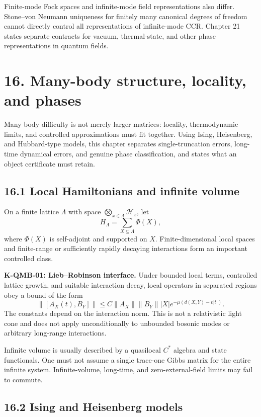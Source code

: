 \documentclass[
  11pt,
  oneside]{book}
\begin{document}
Finite-mode Fock spaces and infinite-mode field representations also
differ. Stone--von Neumann uniqueness for finitely many canonical
degrees of freedom cannot directly control all representations of
infinite-mode CCR. Chapter 21 states separate contracts for vacuum,
thermal-state, and other phase representations in quantum fields.

\chapter{16. Many-body structure, locality, and phases}\label{ch-16}

Many-body difficulty is not merely larger matrices: locality,
thermodynamic limits, and controlled approximations must fit together.
Using Ising, Heisenberg, and Hubbard-type models, this chapter separates
single-truncation errors, long-time dynamical errors, and genuine phase
classification, and states what an object certificate must retain.

\section{16.1 Local Hamiltonians and infinite volume}

On a finite lattice \(\Lambda\) with space
\(\bigotimes_{x\in\Lambda}\mathcal H_x\), let \[
H_\Lambda=\sum_{X\subseteq\Lambda}\Phi(X),
\] where \(\Phi(X)\) is self-adjoint and supported on \(X\).
Finite-dimensional local spaces and finite-range or sufficiently rapidly
decaying interactions form an important controlled class.

\textbf{K-QMB-01: Lieb--Robinson interface.} Under bounded local terms,
controlled lattice growth, and suitable interaction decay, local
operators in separated regions obey a bound of the form \[
\|[A_X(t),B_Y]\|
\le C\|A_X\|\|B_Y\||X|
e^{-\mu(d(X,Y)-v|t|)}.
\] The constants depend on the interaction norm. This is not a
relativistic light cone and does not apply unconditionally to unbounded
bosonic modes or arbitrary long-range interactions.

Infinite volume is usually described by a quasilocal \(C^*\) algebra and
state functionals. One must not assume a single trace-one Gibbs matrix
for the entire infinite system. Infinite-volume, long-time, and
zero-external-field limits may fail to commute.

\section{16.2 Ising and Heisenberg models}
\end{document}

